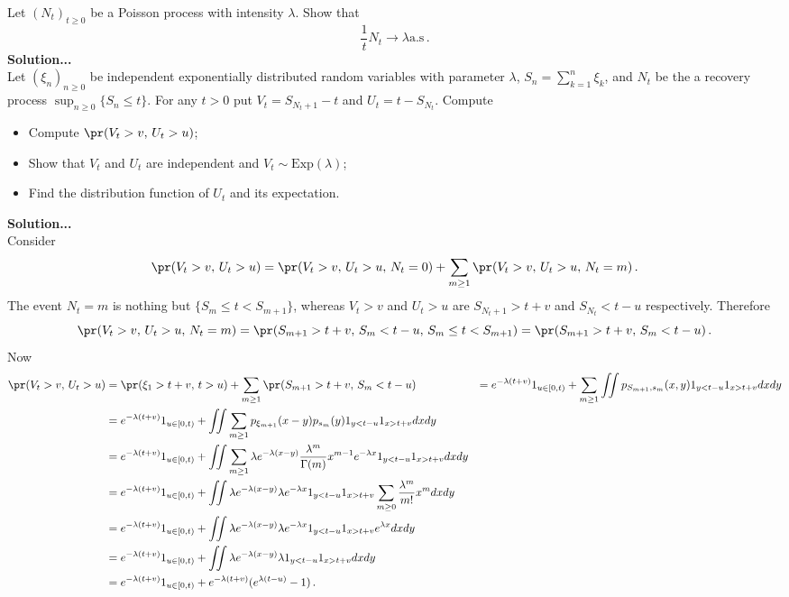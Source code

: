 Let $(N_t)_{t\geq0}$ be a Poisson process with intensity $\lambda$. Show that
\[ \frac{1}{t}N_t \to \lambda \text{a.s}\,. \]
\noindent \textbf{Solution...}\hfill\\

Let $(\xi_n)_{n\geq 0}$ be independent exponentially distributed random variables
with parameter $\lambda$, $S_n = \sum_{k=1}^n \xi_k$, and $N_t$ be the a recovery
process $\sup_{n\geq 0}\{ S_n\leq t \}$. For any $t>0$ put $V_t = S_{N_t+1} - t$ and
$U_t = t-S_{N_t}$. Compute \begin{itemize}
	\item Compute $\pr(V_t > v,\, U_t > u)$;
	\item Show that $V_t$ and $U_t$ are independent and $V_t\sim \text{Exp}(\lambda)$;
	\item Find the distribution function of $U_t$ and its expectation.
\end{itemize}
\noindent \textbf{Solution...}\hfill\\
Consider 
\[ \pr(V_t > v,\, U_t > u) = \pr(V_t > v,\, U_t > u,\, N_t=0)
						   + \sum_{m\geq1} \pr(V_t > v,\, U_t > u,\, N_t=m) \,. \]
The event $N_t=m$ is nothing but $\{S_m\leq t<S_{m+1} \}$, whereas $V_t>v$ and $U_t>u$
are $S_{N_t+1}>t+v$ and $S_{N_t}<t-u$ respectively. Therefore 
\[ \pr(V_t > v,\, U_t > u,\, N_t=m)
	= \pr(S_{m+1}>t+v,\, S_m<t-u,\,S_m\leq t<S_{m+1})
	= \pr(S_{m+1}>t+v,\, S_m < t-u)\,.\]
Now
\begin{align*}
	\pr(V_t > v,\, U_t > u)
		&= \pr(\xi_1>t+v, \, t>u) + \sum_{m\geq1} \pr(S_{m+1}>t+v,\, S_m < t-u)
		&= e^{-\lambda(t+v)}1_{u\in[0,t)} + \sum_{m\geq1} \iint p_{S_{m+1},s_m}(x,y) 1_{y<t-u}1_{x>t+v} dxdy\\
		&= e^{-\lambda(t+v)}1_{u\in[0,t)} + \iint \sum_{m\geq1} p_{\xi_{m+1}}(x-y)p_{s_m}(y) 1_{y<t-u}1_{x>t+v} dxdy\\
		&= e^{-\lambda(t+v)}1_{u\in[0,t)}
			+ \iint \sum_{m\geq1} \lambda e^{-\lambda(x-y)} \frac{\lambda^m}{\Gamma(m)} x^{m-1}e^{-\lambda x} 1_{y<t-u}1_{x>t+v} dxdy\\
		&= e^{-\lambda(t+v)}1_{u\in[0,t)}
			+ \iint \lambda e^{-\lambda(x-y)} \lambda e^{-\lambda x} 1_{y<t-u}1_{x>t+v} \sum_{m\geq0} \frac{\lambda^m}{m!} x^m dxdy\\
		&= e^{-\lambda(t+v)}1_{u\in[0,t)}
			+ \iint \lambda e^{-\lambda(x-y)} \lambda e^{-\lambda x} 1_{y<t-u}1_{x>t+v} e^{\lambda x} dxdy\\
		&= e^{-\lambda(t+v)}1_{u\in[0,t)} + \iint \lambda e^{-\lambda(x-y)} \lambda 1_{y<t-u}1_{x>t+v} dxdy\\
		&= e^{-\lambda(t+v)}1_{u\in[0,t)} + e^{-\lambda(t+v)} ( e^{\lambda(t-u)} - 1 ) \,.
\end{align*}

